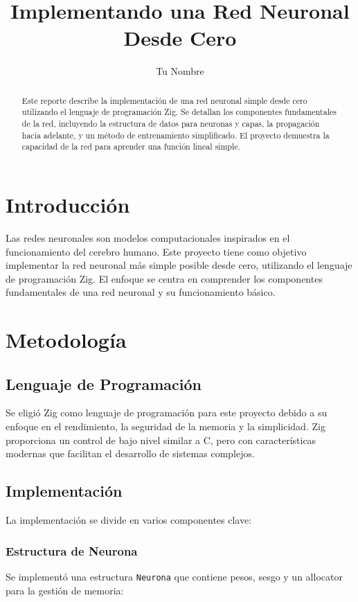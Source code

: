 \documentclass[twocolumn]{article}
\title{Implementando una Red Neuronal Desde Cero}
\author{Tu Nombre}
\date{}
\begin{document}
\maketitle

\begin{abstract}
Este reporte describe la implementación de una red neuronal simple desde cero utilizando el lenguaje de programación Zig. Se detallan los componentes fundamentales de la red, incluyendo la estructura de datos para neuronas y capas, la propagación hacia adelante, y un método de entrenamiento simplificado. El proyecto demuestra la capacidad de la red para aprender una función lineal simple.
\end{abstract}

\section{Introducción}
Las redes neuronales son modelos computacionales inspirados en el funcionamiento del cerebro humano. Este proyecto tiene como objetivo implementar la red neuronal más simple posible desde cero, utilizando el lenguaje de programación Zig. El enfoque se centra en comprender los componentes fundamentales de una red neuronal y su funcionamiento básico.

\section{Metodología}
\subsection{Lenguaje de Programación}
Se eligió Zig como lenguaje de programación para este proyecto debido a su enfoque en el rendimiento, la seguridad de la memoria y la simplicidad. Zig proporciona un control de bajo nivel similar a C, pero con características modernas que facilitan el desarrollo de sistemas complejos.

\subsection{Implementación}
La implementación se divide en varios componentes clave:

\subsubsection{Estructura de Neurona}
Se implementó una estructura \texttt{Neurona} que contiene pesos, sesgo y un allocator para la gestión de memoria:
\end{document}
